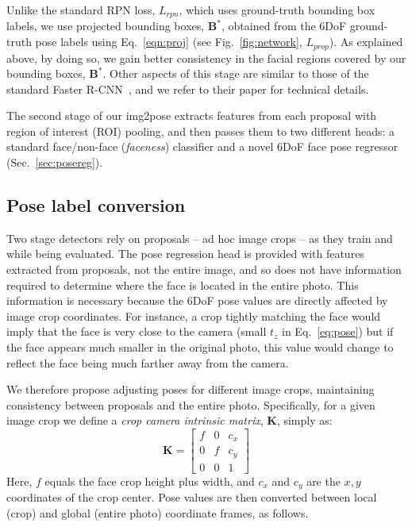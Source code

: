 \documentclass[final]{cvpr}
\begin{document}
Unlike the standard RPN loss, $L_{rpn}$, which uses ground-truth bounding box labels, we use projected bounding boxes, $\mathbf{B^*}$, obtained from the 6DoF ground-truth pose labels using Eq.~\eqref{eqn:proj} (see Fig.~\ref{fig:network}, $L_{prop}$). As explained above, by doing so, we gain better consistency in the facial regions covered by our bounding boxes, $\mathbf{B^*}$. Other aspects of this stage are similar to those of the standard Faster R-CNN~\cite{faster_rcnn}, and we refer to their paper for technical details.

The second stage of our img2pose extracts features from each proposal with region of interest (ROI) pooling, and then passes them to two different heads: a standard face/non-face ({\em faceness}) classifier and a novel 6DoF face pose regressor (Sec.~\ref{sec:posereg}). 


\subsection{Pose label conversion}
\label{sec:pose_conversion}
Two stage detectors rely on proposals -- ad hoc image crops -- as they train and while being evaluated. The pose regression head is provided with features extracted from proposals, not the entire image, and so does not have information required to determine where the face is located in the entire photo. This information is necessary because the 6DoF pose values are directly affected by image crop coordinates. For instance, a crop tightly matching the face would imply that the face is very close to the camera (small $t_z$ in Eq.~\eqref{eq:pose}) but if the face appears much smaller in the original photo, this value would change to reflect the face being much farther away from the camera.   

We therefore propose adjusting poses for different image crops, maintaining consistency between proposals and the entire photo. Specifically, for a given image crop we define a {\em crop camera intrinsic matrix}, $\mathbf{K}$, simply as:
\begin{equation}
    \mathbf{K} = \begin{bmatrix}
    f & 0 & c_x\\
    0 & f & c_y \\
    0 & 0 & 1
    \end{bmatrix}\label{eq:intrinsic}
\end{equation}
Here, $f$ equals the face crop height plus width, and $c_x$ and $c_y$ are the $x,y$ coordinates of the crop center. Pose values are then converted between local (crop) and global (entire photo) coordinate frames, as follows. 
\end{document}
